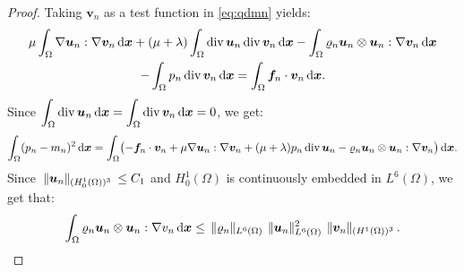 \documentclass{amsart}
\numberwithin{equation}{section}
\begin{document}
\begin{proof}
\smallskip
Taking ${\bm{v}}_n$ as a test function in  \eqref{eq:qdmn} yields:
\begin{multline}
\mu \int_\Omega {{\nabla}} {{\boldsymbol u}}_n : {{\nabla}} {\bm{v}}_n{\, {\rm d}{{\boldsymbol x}}}+(\mu+\lambda)\int_\Omega \operatorname{div}{{\boldsymbol u}}_n \operatorname{div}{\bm{v}}_n{\, {\rm d}{{\boldsymbol x}}} -\int_\Omega {\varrho}_n {{\boldsymbol u}}_n \otimes {{\boldsymbol u}}_n : {{\nabla}} {\bm{v}}_n {\, {\rm d}{{\boldsymbol x}}} \\ - \int_\Omega p_n \operatorname{div} {\bm{v}}_n{\, {\rm d}{{\boldsymbol x}}} = \int _\Omega \bm{f}_n  \cdot {\bm{v}}_n{\, {\rm d}{{\boldsymbol x}}}. \label{eq:biarritz1}
\end{multline}
Since  $\displaystyle \int_\Omega \operatorname{div} {\bm{u}}_n {\, {\rm d}{{\boldsymbol x}}} = \int_\Omega \operatorname{div}{\bm{v}}_n{\, {\rm d}{{\boldsymbol x}}}=0$, we get:
\[
\int_\Omega (p_n-m_n)^2{\, {\rm d}{{\boldsymbol x}}} = \int_\Omega \bigl( -\bm{f}_n  \cdot {\bm{v}}_n + \mu {{\nabla}} {{\boldsymbol u}}_n : {{\nabla}} {\bm{v}}_n +(\mu+\lambda)p_n \operatorname{div} {{\boldsymbol u}}_n -{\varrho}_n {{\boldsymbol u}}_n \otimes {{\boldsymbol u}}_n : {{\nabla}} {\bm{v}}_n\bigr){\, {\rm d}{{\boldsymbol x}}}.
\]
Since ${\hspace{.2em}|\hspace{-.1em}| {{{\boldsymbol u}}_n} |\hspace{-.1em}|_{{(H^1_0(\Omega))^3}}\hspace{.2em}} \le C_1$ and $H^1_0(\Omega)$ is continuously embedded in $L^6(\Omega)$, we get that:
\begin{equation}
\int_\Omega {\varrho}_n {{\boldsymbol u}}_n \otimes {{\boldsymbol u}}_n : {{\nabla}} v_n{\, {\rm d}{{\boldsymbol x}}} \le {\hspace{.2em}|\hspace{-.1em}| {{\varrho}_n} |\hspace{-.1em}|_{{L^6(\Omega)}}\hspace{.2em}} {\hspace{.2em}|\hspace{-.1em}| {{{\boldsymbol u}}_n} |\hspace{-.1em}|^2_{{L^6(\Omega)}}\hspace{.2em}} {\hspace{.2em}|\hspace{-.1em}| {{\bm{v}}_n} |\hspace{-.1em}|_{{(H^1(\Omega))^3}}\hspace{.2em}}.
\label{eq:biarritz2}

\end{equation}
\end{proof}
\end{document}
